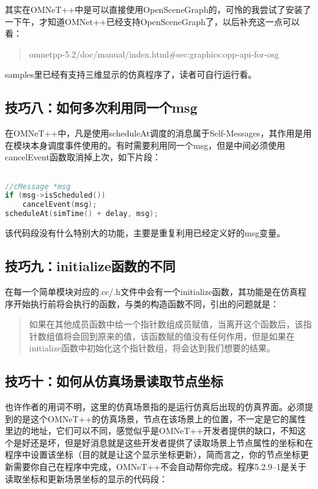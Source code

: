 其实在OMNeT++中是可以直接使用OpenSceneGraph的，可怜的我尝试了安装了一下午，才知道OMNet++已经支持OpenSceneGraph了，以后补充这一点可以看：

\begin{quote}
omnetpp-5.2\slash doc\slash manual\slash index.html\#sec:graphics:opp-api-for-osg 
\end{quote}

samples里已经有支持三维显示的仿真程序了，读者可自行运行看。

\subsection{技巧八：如何多次利用同一个msg}
\label{技巧八：如何多次利用同一个bmsgb}

在OMNeT++中，凡是使用scheduleAt调度的消息属于Self-Messages，其作用是用在模块本身调度事件使用的。有时需要利用同一个msg，但是中间必须使用cancelEvent函数取消掉上次，如下片段：

\begin{lstlisting}[language=c]

//cMessage *msg
if (msg->isScheduled())
    cancelEvent(msg);
scheduleAt(simTime() + delay, msg);
\end{lstlisting}

该代码段没有什么特别大的功能，主要是重复利用已经定义好的msg变量。

\subsection{技巧九：initialize函数的不同}
\label{技巧九：initialize函数的不同}

在每一个简单模块对应的.cc\slash .h文件中会有一个initialize函数，其功能是在仿真程序开始执行前将会执行的函数，与类的构造函数不同，引出的问题就是：

\begin{quote}
如果在其他成员函数中给一个指针数组成员赋值，当离开这个函数后，该指针数组值将会回到原来的值，该函数赋的值没有任何作用，但是如果在initialize函数中初始化这个指针数组，将会达到我们想要的结果。
\end{quote}

\subsection{技巧十：如何从仿真场景读取节点坐标}
\label{技巧十：如何从仿真场景读取节点坐标}

也许作者的用词不明，这里的仿真场景指的是运行仿真后出现的仿真界面。必须提到的是这个OMNeT++的仿真场景，节点在该场景上的位置，不一定是它的属性里边的地址，它们可以不同，感觉似乎是OMNeT++开发者提供的缺口，不知这个是好还是坏，但是好消息就是这些开发者提供了读取场景上节点属性的坐标和在程序中设置该坐标（目的就是让这个显示坐标更新），简而言之，你的节点坐标更新需要你自己在程序中完成，OMNeT++不会自动帮你完成。程序5.2.9--1是关于读取坐标和更新场景坐标的显示的代码段：

